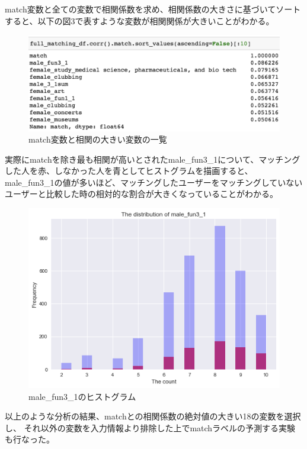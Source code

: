 \documentclass[uplatex]{jsarticle}
\begin{document}
match変数と全ての変数で相関係数を求め、相関係数の大きさに基づいてソートすると、以下の図3で表すような変数が相関関係が大きいことがわかる。
\begin{figure}
  \begin{center}
    \includegraphics[width=15cm]{img/high_corr.png}
    \caption{match変数と相関の大きい変数の一覧}
  \end{center}
\end{figure}
実際にmatchを除き最も相関が高いとされたmale\_fun3\_1について、マッチングした人を赤、しなかった人を青としてヒストグラムを描画すると、
male\_fun3\_1の値が多いほど、マッチングしたユーザーをマッチングしていないユーザーと比較した時の相対的な割合が大きくなっていることがわかる。
\begin{figure}
  \begin{center}
    \includegraphics[width=13cm]{img/corr.png}
    \caption{male\_fun3\_1のヒストグラム}
  \end{center}
\end{figure}

以上のような分析の結果、matchとの相関係数の絶対値の大きい18の変数を選択し、
それ以外の変数を入力情報より排除した上でmatchラベルの予測する実験も行なった。
\end{document}
